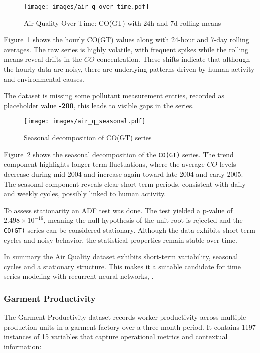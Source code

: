 \documentclass[conference]{IEEEtran}
\begin{document}
\begin{figure}[H]
\centering
\texttt{[image: images/air\_q\_over\_time.pdf]}
\caption{Air Quality Over Time: CO(GT) with 24h and 7d rolling means}
\label{fig:air_q_over_time}
\end{figure}

Figure~\ref{fig:air_q_over_time} shows the hourly CO(GT) values along with 24-hour and 7-day rolling averages. The raw series is highly volatile, with frequent spikes while the rolling means reveal drifts in the $CO$ concentration. These shifts indicate that although the hourly data are noisy, there are underlying patterns driven by human activity and environmental causes.

The dataset is missing some pollutant measurement entries, recorded as placeholder value \textbf{-200}, this leads to visible gaps in the series.

\begin{figure}[H]
\centering
\texttt{[image: images/air\_q\_seasonal.pdf]}
\caption{Seasonal decomposition of CO(GT) series}
\label{fig:air_q_seasonal}
\end{figure}

Figure~\ref{fig:air_q_seasonal} shows the seasonal decomposition of the \texttt{CO(GT)} series. The trend component highlights longer-term fluctuations, where the average $CO$ levels decrease during mid 2004 and increase again toward late 2004 and early 2005. The seasonal component reveals clear short-term periods, consistent with daily and weekly cycles, possibly linked to human activity.

To assess stationarity an ADF test was done. The test yielded a p-value of $2.498 \times 10^{-16}$, meaning the null hypothesis of the unit root is rejected and the \texttt{CO(GT)} series can be considered stationary. Although the data exhibits short term cycles and noisy behavior, the statistical properties remain stable over time.

In summary the Air Quality dataset exhibits short-term variability, seasonal cycles and a stationary structure. This makes it a suitable candidate for time series modeling with recurrent neural networks, \cite{air_quality}.

\subsubsection{\textbf{Garment Productivity}}

The Garment Productivity dataset records worker productivity across multiple production units in a garment factory over a three month period. It contains 1197 instances of 15 variables that capture operational metrics and contextual information:
\end{document}
